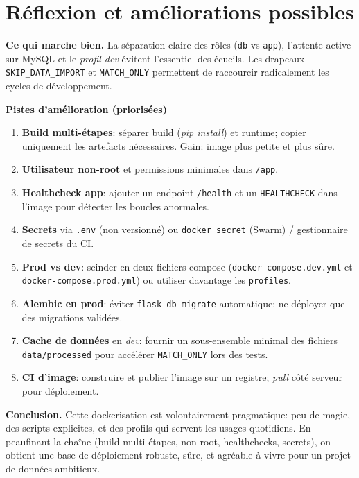 \section{Réflexion et améliorations possibles}
\textbf{Ce qui marche bien.} La séparation claire des rôles (\texttt{db} vs \texttt{app}), l'attente active sur MySQL et le \textit{profil dev} évitent l'essentiel des écueils. Les drapeaux \texttt{SKIP\_DATA\_IMPORT} et \texttt{MATCH\_ONLY} permettent de raccourcir radicalement les cycles de développement.

\medskip
\noindent\textbf{Pistes d'amélioration (priorisées)}
\begin{enumerate}
  \item \textbf{Build multi-étapes}: séparer build (\textit{pip install}) et runtime; copier uniquement les artefacts nécessaires. Gain: image plus petite et plus sûre.
  \item \textbf{Utilisateur non-root} et permissions minimales dans \texttt{/app}.
  \item \textbf{Healthcheck app}: ajouter un endpoint \texttt{/health} et un \texttt{HEALTHCHECK} dans l'image pour détecter les boucles anormales.
  \item \textbf{Secrets} via \texttt{.env} (non versionné) ou \texttt{docker secret} (Swarm) / gestionnaire de secrets du CI.
  \item \textbf{Prod vs dev}: scinder en deux fichiers compose (\texttt{docker-compose.dev.yml} et \texttt{docker-compose.prod.yml}) ou utiliser davantage les \texttt{profiles}.
  \item \textbf{Alembic en prod}: éviter \texttt{flask db migrate} automatique; ne déployer que des migrations validées.
  \item \textbf{Cache de données} en \textit{dev}: fournir un sous-ensemble minimal des fichiers \texttt{data/processed} pour accélérer \texttt{MATCH\_ONLY} lors des tests.
  \item \textbf{CI d'image}: construire et publier l'image sur un registre; \textit{pull} côté serveur pour déploiement.
\end{enumerate}

\medskip
\noindent\textbf{Conclusion.} Cette dockerisation est volontairement pragmatique: peu de magie, des scripts explicites, et des profils qui servent les usages quotidiens. En peaufinant la chaîne (build multi-étapes, non-root, healthchecks, secrets), on obtient une base de déploiement robuste, sûre, et agréable à vivre pour un projet de données ambitieux.
